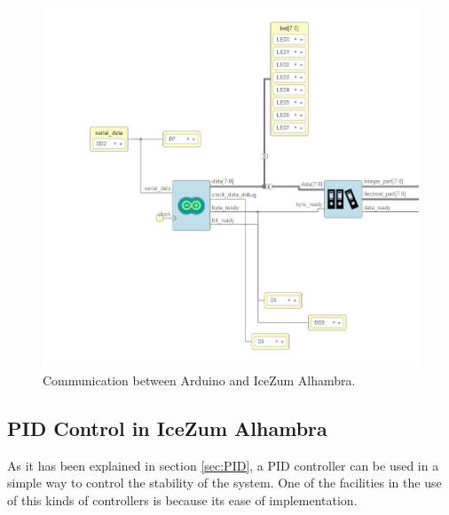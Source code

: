 \begin{figure}[H]
	\center
	\includegraphics[scale=0.4]{imagenes/Balancing_robot/arduino_arrange.PNG}
	\caption{Communication between Arduino and IceZum Alhambra.}
	\label{fig:arduino_arrange}
\end{figure}




\subsection{PID Control in IceZum Alhambra}
As it has been explained in section \ref{sec:PID}, a PID controller can be used in a simple way to control the stability of the system. \newline
One of the facilities in the use of this kinds of controllers is because its ease of implementation.
